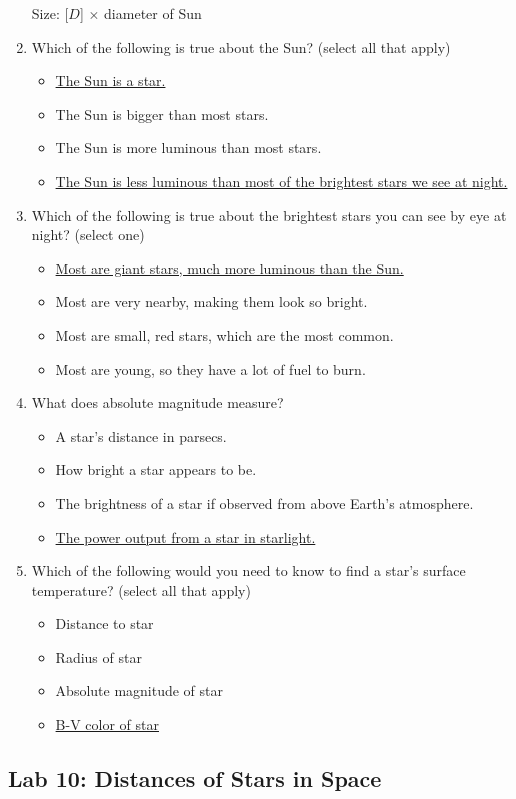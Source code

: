 \documentclass[12pt]{article}
\begin{document}
\begin{enumerate}
Size: [$D$] $\times$ diameter of Sun
\item
Which of the following is true about the Sun? (select all that apply)
\begin{itemize}
    \item \underline{The Sun is a star.}
    \item The Sun is bigger than most stars.
    \item The Sun is more luminous than most stars.
    \item \underline{The Sun is less luminous than most of the brightest stars we see at night.}
\end{itemize}
\item
Which of the following is true about the brightest stars you can see by eye at night? (select one)
\begin{itemize}
    \item \underline{Most are giant stars, much more luminous than the Sun.}
    \item Most are very nearby, making them look so bright.
    \item Most are small, red stars, which are the most common.%
    \item Most are young, so they have a lot of fuel to burn.
\end{itemize}
\item
What does absolute magnitude measure?
\begin{itemize}
    \item A star's distance in parsecs.
    \item How bright a star appears to be.
    \item The brightness of a star if observed from above Earth's atmosphere.
    \item \underline{The power output from a star in starlight.}
\end{itemize}
\item
Which of the following would you need to know to find a star's surface temperature? (select all that apply)
\begin{itemize}
    \item Distance to star
    \item Radius of star
    \item Absolute magnitude of star
    \item \underline{B-V color of star}
\end{itemize}
\end{enumerate}

\newpage
\subsection{Lab 10: Distances of Stars in Space}
\end{document}
